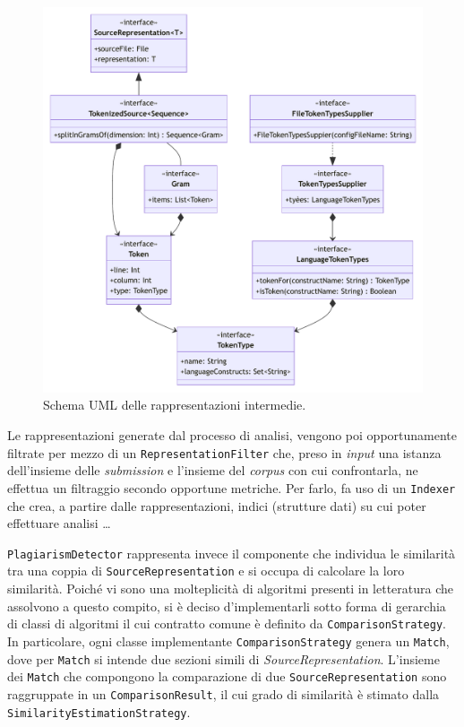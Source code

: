 \begin{figure}[h!]
    \centering
    \includegraphics[width=\textwidth]{resources/img/02-representations.pdf}
    \caption{Schema UML delle rappresentazioni intermedie.}
    \label{img:02-representations}
\end{figure}

Le rappresentazioni generate dal processo di analisi, vengono poi opportunamente filtrate per mezzo di un \texttt{RepresentationFilter} che, preso in \textit{input} una istanza dell'insieme delle \textit{submission} e l'insieme del \textit{corpus} con cui confrontarla, ne effettua un filtraggio secondo opportune metriche.
%
Per farlo, fa uso di un \texttt{Indexer} che crea, a partire dalle rappresentazioni, indici (strutture dati) su cui poter effettuare analisi \dots


\texttt{PlagiarismDetector} rappresenta invece il componente che individua le similarità tra una coppia di \texttt{SourceRepresentation} e si occupa di calcolare la loro similarità.
%
Poiché vi sono una molteplicità di algoritmi presenti in letteratura che assolvono a questo compito, si è deciso d'implementarli sotto forma di gerarchia di classi di algoritmi il cui contratto comune è definito da \texttt{ComparisonStrategy}. 
%
In particolare, ogni classe implementante \texttt{ComparisonStrategy} genera un \texttt{Match}, dove per \texttt{Match} si intende due sezioni simili di \textit{SourceRepresentation}.
%
L'insieme dei \texttt{Match} che compongono la comparazione di due \texttt{SourceRepresentation} sono raggruppate in un \texttt{ComparisonResult}, il cui grado di similarità è stimato dalla \texttt{SimilarityEstimationStrategy}.

